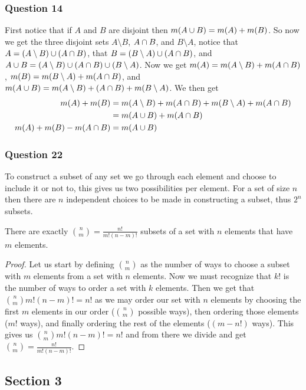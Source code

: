\documentclass{article}
\begin{document}
\subsubsection{Question 14}
First notice that if $A$ and $B$ are disjoint then $m(A\cup B) = m(A) + m(B)$. So now we get the three disjoint sets $A\setminus B$, $A\cap B$, and $B\setminus A$, notice that $A =( A\setminus B) \cup (A\cap B)$, that $B =(B\setminus A)\cup(A\cap B)$, and $A\cup B = (A\setminus B)\cup (A\cap B)\cup (B\setminus A)$. Now we get $m(A) = m(A\setminus B) + m(A\cap B)$, $m(B) = m(B\setminus A) + m(A\cap B)$, and $m(A\cup B) = m(A\setminus B)+(A\cap B)+m(B\setminus A)$. We then get \begin{align*}
m(A) + m(B) &= m(A\setminus B)+m(A \cap B)+m(B\setminus A)+m(A\cap B)\\
&= m(A\cup B) + m(A\cap B)\\
m(A) + m(B) - m(A \cap B) &= m(A \cup B)
\end{align*}

\subsubsection{Question 22}
 To construct a subset of any set we go through each element and choose to include it or not to, this gives us two possibilities per element. For a set of size $n$ then there are $n$ independent choices to be made in constructing a subset, thus $2^n$ subsets.

 There are exactly $\binom nm = \frac{n!}{m!(n-m)!}$ subsets of a set with $n$ elements that have $m$ elements.

\begin{proof}
	Let us start by defining $\binom nm$ as the number of ways to choose a subset with $m$ elements from a set with $n$ elements. Now we must recognize that $k!$ is the number of ways to order a set with $k$ elements. Then we get that $\binom nmm!(n-m)! = n!$ as we may order our set with $n$ elements by choosing the first $m$ elements in our order ($\binom nm$ possible ways), then ordering those elements ($m!$ ways), and finally ordering the rest of the elements ($(m-n!)$ ways). This gives us $\binom nmm!(n-m)!=n!$ and from there we divide and get $\binom nm=\frac{n!}{m!(n-m)!}$.
\end{proof}

\subsection{Section 3}
\end{document}
